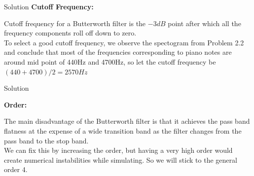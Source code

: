 \documentclass{beamer}
\begin{document}
\begin{frame}{Solution}
  \textbf{Cutoff Frequency:} 
  
  Cutoff frequency for a Butterworth filter is the $-3dB$ point after which all the frequency components roll off down to zero.\\
  To select a good cutoff frequency, we observe the spectogram from Problem 2.2 and conclude that most of the frequencies corresponding to piano notes are around mid point of 440Hz and 4700Hz, so let the cutoff frequency be $(440+4700)/2 = 2570Hz$
  
\end{frame}

\begin{frame}{Solution}

  \textbf{Order:} 

  The main disadvantage of the Butterworth filter is that it achieves the pass band flatness at the expense of a wide transition band as the filter changes from the pass band to the stop band.\\
  We can fix this by increasing the order, but having a very high order would create numerical instabilities while simulating. So we will stick to the general order 4.
\end{frame}
\end{document}
